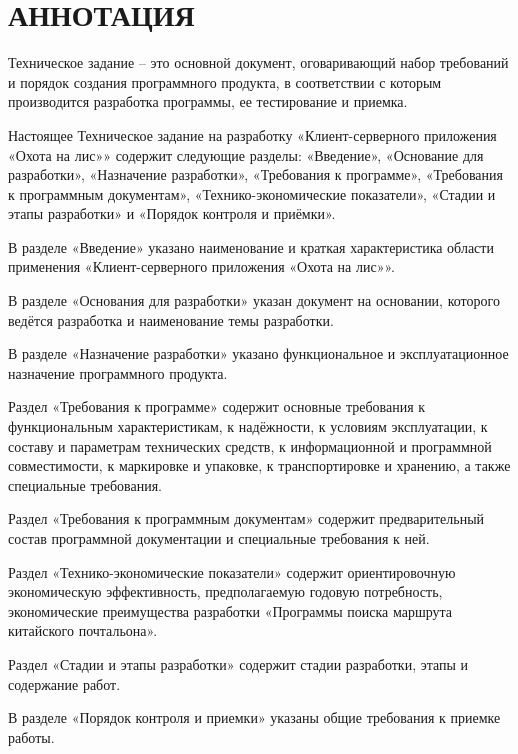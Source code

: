 \section*{АННОТАЦИЯ}

Техническое задание – это основной документ, оговаривающий набор требований и
порядок создания программного продукта, в соответствии с которым производится разработка
программы, ее тестирование и приемка.

Настоящее Техническое задание на разработку «Клиент-серверного приложения «Охота на лис»» содержит следующие разделы: «Введение», «Основание для разработки», «Назначение разработки», «Требования к программе», «Требования к программным документам»,
«Технико-экономические показатели», «Стадии и этапы разработки» и «Порядок контроля и приёмки».

В разделе «Введение» указано наименование и краткая характеристика области применения «Клиент-серверного приложения «Охота на лис»».

В разделе «Основания для разработки» указан документ на основании, которого ведётся разработка и наименование темы разработки.

В разделе «Назначение разработки» указано функциональное и эксплуатационное назначение программного продукта.

Раздел «Требования к программе» содержит основные требования к функциональным характеристикам, к надёжности, к условиям эксплуатации, к составу и параметрам технических средств, к информационной и программной совместимости, к маркировке и упаковке, к транспортировке и хранению, а также специальные требования.

Раздел «Требования к программным документам» содержит предварительный состав программной документации и специальные требования к ней.

Раздел «Технико-экономические показатели» содержит ориентировочную экономическую эффективность, предполагаемую годовую потребность, экономические преимущества разработки «Программы поиска маршрута китайского почтальона».

Раздел «Стадии и этапы разработки» содержит стадии разработки, этапы и содержание работ.

В разделе «Порядок контроля и приемки» указаны общие требования к приемке работы.

